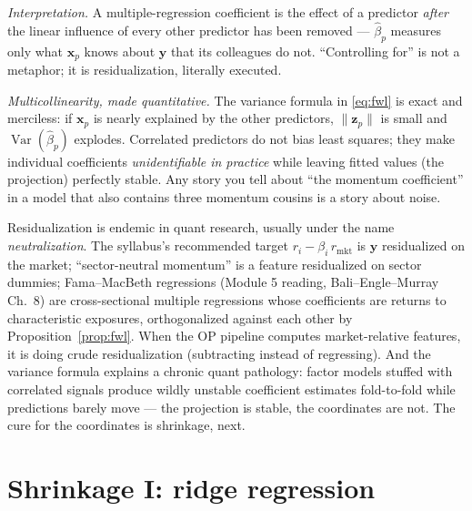\documentclass[11pt]{article}
\numberwithin{equation}{section}
\theoremstyle{plain}
\theoremstyle{definition}
\theoremstyle{remark}
\DeclareMathOperator{\Var}{Var}
\newcommand{\x}{\bm{x}}
\newcommand{\y}{\bm{y}}
\begin{document}
\emph{Interpretation.} A multiple-regression coefficient is the effect of a predictor \emph{after} the linear influence of every other predictor has been removed --- $\hat\beta_p$ measures only what $\x_p$ knows about $\y$ that its colleagues do not. ``Controlling for'' is not a metaphor; it is residualization, literally executed.

\emph{Multicollinearity, made quantitative.} The variance formula in \eqref{eq:fwl} is exact and merciless: if $\x_p$ is nearly explained by the other predictors, $\|\bm{z}_p\|$ is small and $\Var(\hat\beta_p)$ explodes. Correlated predictors do not bias least squares; they make individual coefficients \emph{unidentifiable in practice} while leaving fitted values (the projection) perfectly stable. Any story you tell about ``the momentum coefficient'' in a model that also contains three momentum cousins is a story about noise.

\begin{finbox}
Residualization is endemic in quant research, usually under the name \emph{neutralization}. The syllabus's recommended target $r_i - \beta_i\, r_{\text{mkt}}$ is $\y$ residualized on the market; ``sector-neutral momentum'' is a feature residualized on sector dummies; Fama--MacBeth regressions (Module 5 reading, Bali--Engle--Murray Ch.\ 8) are cross-sectional multiple regressions whose coefficients are returns to characteristic exposures, orthogonalized against each other by Proposition~\ref{prop:fwl}. When the OP pipeline computes market-relative features, it is doing crude residualization (subtracting instead of regressing). And the variance formula explains a chronic quant pathology: factor models stuffed with correlated signals produce wildly unstable coefficient estimates fold-to-fold while predictions barely move --- the projection is stable, the coordinates are not. The cure for the coordinates is shrinkage, next.
\end{finbox}


\section{Shrinkage I: ridge regression}\label{sec:ridge}
\end{document}
